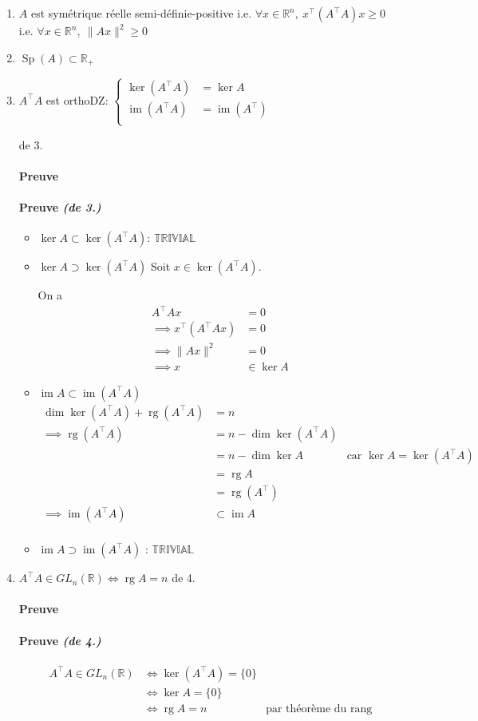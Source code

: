 \documentclass{article}
\newcommand{\trivial}{$\mathbb{TRIVIAL}$}
\newcommand{\image}{\operatorname{im}}
\newcommand{\rg}{\operatorname{rg}}
\renewcommand{\dim}{\operatorname{dim}}
\newcommand{\R}{\mathbb{R}}
\newenvironment{proof}[1][\unskip]{
	\def\temp{#1}\ifx\temp\empty
		\paragraph{Preuve}
	\else
		\paragraph{Preuve \emph{(#1)}}
	\fi

}{}
\begin{document}
\begin{enumerate}
	\item $A$ est symétrique réelle semi-définie-positive i.e. $\forall x \in \R^n,\ x^\top (A^\top A)x \ge 0$ i.e. $\forall x\in \R^n,\ \|Ax\|^2\ge 0$
	\item $\operatorname{Sp}(A) \subset \R_+$
	\item $A^\top A$ est orthoDZ: $\begin{cases}
		\ker(A^\top A) &= \ker A \\
		\image(A^\top A) &= \image (A^\top) \\
	\end{cases}$

	\begin{proof}[de 3.]
		\begin{itemize}
			\item $\ker A \subset  \ker(A^\top A)$: \trivial
			\item $\ker A \supset \ker(A^\top A)$
			Soit $x\in \ker(A^\top A)$.

			On a \begin{align*}
				A^\top A x &= 0 \\
				\implies x^\top (A^\top A x) &= 0 \\
				\implies \|Ax\|^2 &= 0 \\
				\implies x &\in \ker A
			\end{align*}

			\item $\image A \subset  \image(A^\top A)$ 
				\begin{align*}
					\dim \ker (A^\top A) + \rg (A^\top A) &= n \\
					\implies \rg(A^\top A) &= n - \dim \ker(A^\top A) \\
					&= n - \dim \ker A \quad&\text{car $\ker A = \ker (A^\top A)$} \\
					&=  \rg A \\
					&= \rg (A^\top) \\
					\implies \image(A^\top A) &\subset   \image A \\
				\end{align*}
			\item $\image A \supset  \image(A^\top A)$ : \trivial
		\end{itemize}
	\end{proof}

	\item $A ^\top A \in GL_n(\R) \iff \rg A = n$
		\begin{proof}[de 4.]
		\begin{align*}
			A^\top A \in GL_n(\R) &\iff \ker(A^\top A) = \{0\}  \\
					      &\iff \ker A = \{0\} \\
					      &\iff \rg A = n \quad&\text{par théorème du rang}
		\end{align*}
	\end{proof}
\end{enumerate}
\end{document}
